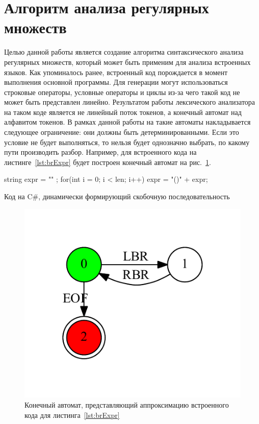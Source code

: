 \section{Алгоритм анализа регулярных множеств}
Целью данной работы является создание алгоритма синтаксического анализа регулярных множеств, который может быть применим для анализа встроенных языков. Как упоминалось ранее, встроенный код порождается в момент выполнения основной программы. Для генерации могут использоваться строковые операторы, условные операторы и циклы из-за чего такой код не может быть представлен линейно. Результатом работы лексического анализатора на таком коде является не линейный поток токенов, а конечный автомат над алфавитом токенов. В рамках данной работы на такие автоматы накладывается следующее ограничение: они должны быть детерминированными. Если это условие не будет выполняться, то нельзя будет однозначно выбрать, по какому пути производить разбор. Например, для встроенного кода на листинге~\ref{lst:brExpr} будет построен конечный автомат на рис.~\ref{input}.

\begin{listing}
\begin{pyglist}[language=csharp,numbers=left,numbersep=5pt]
 string expr = "" ;
 for(int i = 0; i < len; i++) 
 {
     expr = "()" + expr;
 }
\end{pyglist}
\caption{Код на C\#, динамически формирующий скобочную последовательность}
\label{lst:brExpr}
\end{listing}

\begin{figure}[h]
 \centering
 \includegraphics[width=\textwidth]{Ragozina/pics/input.pdf}
 \caption{Конечный автомат, представляющий аппроксимацию встроенного кода для листинга~\ref{lst:brExpr} }
 \label{input}
\end{figure}

